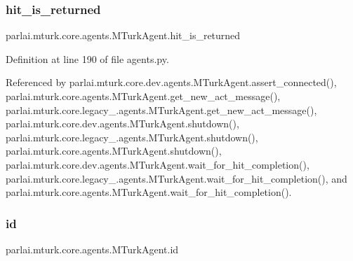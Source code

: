 \mbox{\label{classparlai_1_1mturk_1_1core_1_1agents_1_1MTurkAgent_a8f4078973bf1552910cf77773f00cd4c}} 
\subsubsection{\texorpdfstring{hit\+\_\+is\+\_\+returned}{hit\_is\_returned}}
{\footnotesize\ttfamily parlai.\+mturk.\+core.\+agents.\+M\+Turk\+Agent.\+hit\+\_\+is\+\_\+returned}



Definition at line 190 of file agents.\+py.



Referenced by parlai.\+mturk.\+core.\+dev.\+agents.\+M\+Turk\+Agent.\+assert\+\_\+connected(), parlai.\+mturk.\+core.\+agents.\+M\+Turk\+Agent.\+get\+\_\+new\+\_\+act\+\_\+message(), parlai.\+mturk.\+core.\+legacy\+\_.\+agents.\+M\+Turk\+Agent.\+get\+\_\+new\+\_\+act\+\_\+message(), parlai.\+mturk.\+core.\+dev.\+agents.\+M\+Turk\+Agent.\+shutdown(), parlai.\+mturk.\+core.\+legacy\+\_.\+agents.\+M\+Turk\+Agent.\+shutdown(), parlai.\+mturk.\+core.\+agents.\+M\+Turk\+Agent.\+shutdown(), parlai.\+mturk.\+core.\+dev.\+agents.\+M\+Turk\+Agent.\+wait\+\_\+for\+\_\+hit\+\_\+completion(), parlai.\+mturk.\+core.\+legacy\+\_.\+agents.\+M\+Turk\+Agent.\+wait\+\_\+for\+\_\+hit\+\_\+completion(), and parlai.\+mturk.\+core.\+agents.\+M\+Turk\+Agent.\+wait\+\_\+for\+\_\+hit\+\_\+completion().

\mbox{\label{classparlai_1_1mturk_1_1core_1_1agents_1_1MTurkAgent_a88ae98b0e8133e9fff2475d09a6f2a81}} 
\subsubsection{\texorpdfstring{id}{id}}
{\footnotesize\ttfamily parlai.\+mturk.\+core.\+agents.\+M\+Turk\+Agent.\+id}



